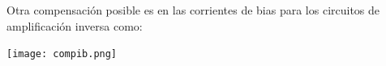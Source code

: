 \begin{itemize}
    Otra compensación posible es en las corrientes de bias para los circuitos de amplificación inversa como:
    
    \begin{center}
        \begin{minipage}{0.7\textwidth}
            \texttt{[image: compib.png]}
        \captionsetup{justification=centering}
        \label{ej2compib}
        \end{minipage}
    \end{center}
    
\end{itemize}